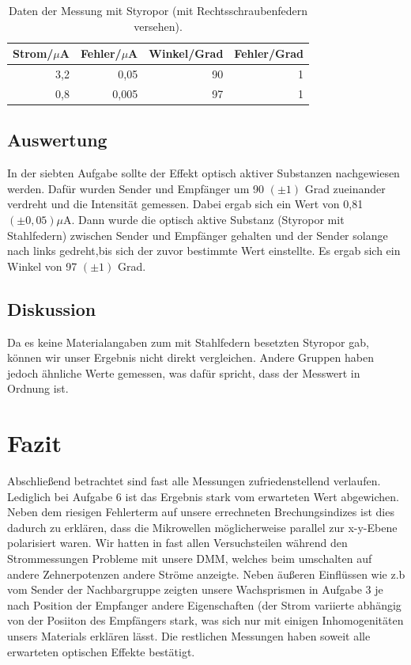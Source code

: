 \documentclass[12pt]{scrartcl}
\begin{document}
\begin{table}[H]
\caption{Daten der Messung mit Styropor (mit Rechtsschraubenfedern versehen).}
\centering
\begin{tabular}{|r|r|r|r|}
\hline
\multicolumn{1}{|l|}{Strom/$\mu$A} & \multicolumn{1}{c|}{Fehler/$\mu$A} & \multicolumn{1}{l|}{Winkel/Grad} & \multicolumn{1}{l|}{Fehler/Grad} \\ \hline
3,2 & 0,05 & 90 & 1 \\ \hline
0,8 & 0,005 & 97 & 1 \\ \hline
\end{tabular}
\label{tab:a_7_m}
\end{table}
\subsection{Auswertung}
In der siebten Aufgabe sollte der Effekt optisch aktiver Substanzen nachgewiesen werden. Dafür wurden Sender und Empfänger um 90 $(\pm 1)$ Grad zueinander verdreht und die Intensität gemessen. Dabei ergab sich ein Wert von 0,81 $(\pm 0,05) \mu$A.  Dann wurde die optisch aktive Substanz (Styropor mit Stahlfedern) zwischen Sender und Empfänger gehalten und der Sender solange nach links gedreht,bis sich der zuvor bestimmte Wert einstellte. Es ergab sich ein Winkel von 97 $(\pm 1)$ Grad.
\subsection{Diskussion}
Da es keine Materialangaben zum mit Stahlfedern besetzten Styropor gab, können wir unser Ergebnis nicht direkt vergleichen. Andere Gruppen haben jedoch ähnliche Werte gemessen, was dafür spricht, dass der Messwert in Ordnung ist.
\section{Fazit}
Abschließend betrachtet sind fast alle Messungen zufriedenstellend verlaufen. Lediglich bei Aufgabe 6 ist das Ergebnis stark vom erwarteten Wert abgewichen. Neben dem riesigen Fehlerterm auf unsere errechneten Brechungsindizes ist dies dadurch zu erklären, dass die Mikrowellen möglicherweise parallel zur x-y-Ebene  polarisiert waren.
Wir hatten in fast allen Versuchsteilen während den Strommessungen Probleme mit unsere DMM, welches beim umschalten auf andere Zehnerpotenzen andere Ströme anzeigte.
Neben äußeren Einflüssen wie z.b vom Sender der Nachbargruppe zeigten unsere Wachsprismen in Aufgabe 3 je nach Position der Empfanger andere Eigenschaften (der Strom variierte abhängig von der Posiiton des Empfängers stark, was sich nur mit einigen Inhomogenitäten unsers Materials erklären lässt. 
Die restlichen Messungen haben soweit alle erwarteten optischen Effekte bestätigt.

\end{document}
